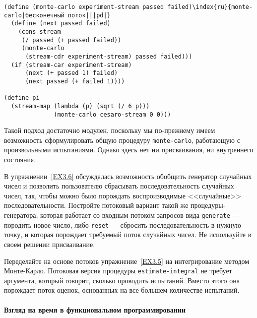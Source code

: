 \begin{Verbatim}[fontsize=\small]
(define (monte-carlo experiment-stream passed failed)\index{ru}{monte-carlo|бесконечный поток|||pd|}
  (define (next passed failed)
    (cons-stream
     (/ passed (+ passed failed))
     (monte-carlo
      (stream-cdr experiment-stream) passed failed)))
  (if (stream-car experiment-stream)
      (next (+ passed 1) failed)
      (next passed (+ failed 1))))

(define pi
  (stream-map (lambda (p) (sqrt (/ 6 p)))
              (monte-carlo cesaro-stream 0 0)))
\end{Verbatim}
Такой подход достаточно модулен, поскольку
мы по-прежнему имеем возможность сформулировать общую процедуру
{\tt monte-carlo}, работающую с произвольными испытаниями.
Однако здесь нет ни присваивания, ни внутреннего состояния.
\begin{exercise}{3.81}\label{EX3.81}%
%
В упражнении~\ref{EX3.6} обсуждалась
возможность обобщить генератор случайных чисел и позволить
пользователю сбрасывать последовательность случайных чисел, так, чтобы
можно было порождать воспроизводимые <<случайные>>
последовательности.  Постройте потоковый вариант такой же процедуры-генератора,
которая работает со входным потоком запросов вида
{\tt generate} --- породить новое число, либо
{\tt reset} --- сбросить последовательность в нужную точку, и
которая порождает требуемый поток случайных чисел.  Не используйте в
своем решении присваивание.
\end{exercise}
\begin{exercise}{3.82}\label{EX3.82}%
Переделайте на основе потоков упражнение~\ref{EX3.5} на
интегрирование методом Монте-Карло.
Потоковая версия процедуры
{\tt estimate-integral} не требует аргумента, который говорит,
сколько проводить испытаний.  Вместо этого она порождает поток оценок,
основанных на все большем количестве испытаний.
\end{exercise}

\paragraph{Взгляд на время в функциональном программировании}

